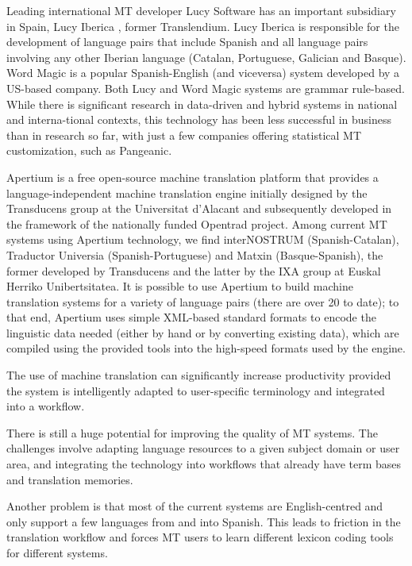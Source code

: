 \begin{multicols}{2}
Leading international MT developer Lucy Software has an important subsidiary in Spain, Lucy Iberica , former Translendium. Lucy Iberica is responsible for the development of language pairs that include Spanish and all language pairs involving any other Iberian language (Catalan, Portuguese, Galician and Basque). Word Magic is a popular Spanish-English (and viceversa) system developed by a US-based company. Both Lucy and Word Magic systems are grammar rule-based. While there is significant research in data-driven and hybrid systems in national and interna-tional contexts, this technology has been less successful in business than in research so far, with just a few companies offering statistical MT customization, such as Pangeanic. 

Apertium is a free open-source machine translation platform that provides a language-independent machine translation engine initially designed by the Transducens group at the Universitat d'Alacant and subsequently developed in the framework of  the nationally funded Opentrad project. Among current MT systems using Apertium technology, we find interNOSTRUM (Spanish-Catalan), Traductor Universia (Spanish-Portuguese) and Matxin (Basque-Spanish), the former developed by Transducens and the latter by the IXA group  at Euskal Herriko Unibertsitatea. It is possible to use Apertium to build machine translation systems for a variety of language pairs (there are over 20 to date); to that end, Apertium uses simple XML-based standard formats to encode the linguistic data needed (either by hand or by converting existing data), which are compiled using the provided tools into the high-speed formats used by the engine.

The use of machine translation can significantly increase productivity provided the system is intelligently adapted to user-specific terminology and integrated into a workflow. 
 
There is still a huge potential for improving the quality of MT systems. The challenges involve adapting language resources to a given subject domain or user area, and integrating the technology into workflows that already have term bases and translation memories.

 
Another problem is that most of the current systems are English-centred and only support a few languages from and into Spanish. This leads to friction in the translation workflow and forces MT users to learn different lexicon coding tools for different systems.


\end{multicols}
